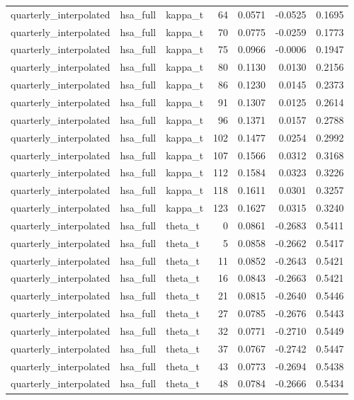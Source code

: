 \begin{tabular}{lllrrrr}
quarterly\_interpolated & hsa\_full & kappa\_t & 64 & 0.0571 & -0.0525 & 0.1695 \\
quarterly\_interpolated & hsa\_full & kappa\_t & 70 & 0.0775 & -0.0259 & 0.1773 \\
quarterly\_interpolated & hsa\_full & kappa\_t & 75 & 0.0966 & -0.0006 & 0.1947 \\
quarterly\_interpolated & hsa\_full & kappa\_t & 80 & 0.1130 & 0.0130 & 0.2156 \\
quarterly\_interpolated & hsa\_full & kappa\_t & 86 & 0.1230 & 0.0145 & 0.2373 \\
quarterly\_interpolated & hsa\_full & kappa\_t & 91 & 0.1307 & 0.0125 & 0.2614 \\
quarterly\_interpolated & hsa\_full & kappa\_t & 96 & 0.1371 & 0.0157 & 0.2788 \\
quarterly\_interpolated & hsa\_full & kappa\_t & 102 & 0.1477 & 0.0254 & 0.2992 \\
quarterly\_interpolated & hsa\_full & kappa\_t & 107 & 0.1566 & 0.0312 & 0.3168 \\
quarterly\_interpolated & hsa\_full & kappa\_t & 112 & 0.1584 & 0.0323 & 0.3226 \\
quarterly\_interpolated & hsa\_full & kappa\_t & 118 & 0.1611 & 0.0301 & 0.3257 \\
quarterly\_interpolated & hsa\_full & kappa\_t & 123 & 0.1627 & 0.0315 & 0.3240 \\
quarterly\_interpolated & hsa\_full & theta\_t & 0 & 0.0861 & -0.2683 & 0.5411 \\
quarterly\_interpolated & hsa\_full & theta\_t & 5 & 0.0858 & -0.2662 & 0.5417 \\
quarterly\_interpolated & hsa\_full & theta\_t & 11 & 0.0852 & -0.2643 & 0.5421 \\
quarterly\_interpolated & hsa\_full & theta\_t & 16 & 0.0843 & -0.2663 & 0.5421 \\
quarterly\_interpolated & hsa\_full & theta\_t & 21 & 0.0815 & -0.2640 & 0.5446 \\
quarterly\_interpolated & hsa\_full & theta\_t & 27 & 0.0785 & -0.2676 & 0.5443 \\
quarterly\_interpolated & hsa\_full & theta\_t & 32 & 0.0771 & -0.2710 & 0.5449 \\
quarterly\_interpolated & hsa\_full & theta\_t & 37 & 0.0767 & -0.2742 & 0.5447 \\
quarterly\_interpolated & hsa\_full & theta\_t & 43 & 0.0773 & -0.2694 & 0.5438 \\
quarterly\_interpolated & hsa\_full & theta\_t & 48 & 0.0784 & -0.2666 & 0.5434 \\

\end{tabular}
